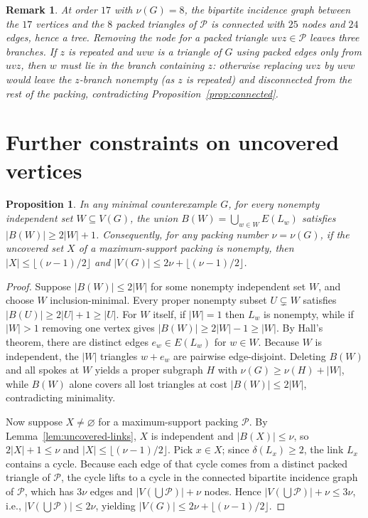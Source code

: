 \documentclass[11pt]{article}
\newtheorem{proposition}[theorem]{Proposition}
\newtheorem{remark}[theorem]{Remark}
\begin{document}
\begin{remark}
At order $17$ with $\nu(G)=8$, the bipartite incidence graph between the $17$ vertices and the $8$ packed triangles of $\mathcal{P}$ is connected with $25$ nodes and $24$ edges, hence a tree. Removing the node for a packed triangle $uvz\in\mathcal{P}$ leaves three branches. If $z$ is repeated and $uvw$ is a triangle of $G$ using packed edges only from $uvz$, then $w$ must lie in the branch containing $z$: otherwise replacing $uvz$ by $uvw$ would leave the $z$-branch nonempty (as $z$ is repeated) and disconnected from the rest of the packing, contradicting Proposition~\ref{prop:connected}.
\end{remark}

\section{Further constraints on uncovered vertices}

\begin{proposition}
In any minimal counterexample $G$, for every nonempty independent set $W\subseteq V(G)$, the union $B(W)=\bigcup_{w\in W}E(L_w)$ satisfies $|B(W)|\geq 2|W|+1$. Consequently, for any packing number $\nu=\nu(G)$, if the uncovered set $X$ of a maximum-support packing is nonempty, then $|X|\leq\lfloor(\nu-1)/2\rfloor$ and $|V(G)|\leq 2\nu+\lfloor(\nu-1)/2\rfloor$.
\end{proposition}

\begin{proof}
Suppose $|B(W)|\leq 2|W|$ for some nonempty independent set $W$, and choose $W$ inclusion-minimal. Every proper nonempty subset $U\subsetneq W$ satisfies $|B(U)|\geq 2|U|+1\geq |U|$. For $W$ itself, if $|W|=1$ then $L_w$ is nonempty, while if $|W|>1$ removing one vertex gives $|B(W)|\geq 2|W|-1\geq |W|$. By Hall's theorem, there are distinct edges $e_w\in E(L_w)$ for $w\in W$. Because $W$ is independent, the $|W|$ triangles $w+e_w$ are pairwise edge-disjoint. Deleting $B(W)$ and all spokes at $W$ yields a proper subgraph $H$ with $\nu(G)\geq\nu(H)+|W|$, while $B(W)$ alone covers all lost triangles at cost $|B(W)|\leq 2|W|$, contradicting minimality.

Now suppose $X\neq\varnothing$ for a maximum-support packing $\mathcal{P}$. By Lemma~\ref{lem:uncovered-links}, $X$ is independent and $|B(X)|\leq\nu$, so $2|X|+1\leq\nu$ and $|X|\leq\lfloor(\nu-1)/2\rfloor$. Pick $x\in X$; since $\delta(L_x)\geq 2$, the link $L_x$ contains a cycle. Because each edge of that cycle comes from a distinct packed triangle of $\mathcal{P}$, the cycle lifts to a cycle in the connected bipartite incidence graph of $\mathcal{P}$, which has $3\nu$ edges and $|V(\bigcup\mathcal{P})|+\nu$ nodes. Hence $|V(\bigcup\mathcal{P})|+\nu\leq 3\nu$, i.e., $|V(\bigcup\mathcal{P})|\leq 2\nu$, yielding $|V(G)|\leq 2\nu+\lfloor(\nu-1)/2\rfloor$.
\end{proof}
\end{document}

